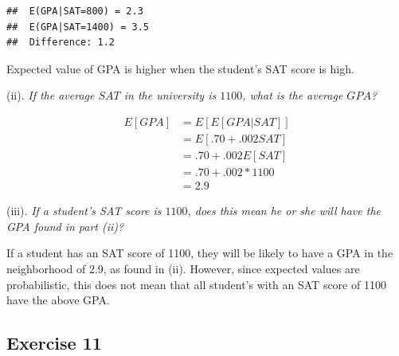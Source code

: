 \documentclass[
]{article}
\begin{document}
\begin{verbatim}
##  E(GPA|SAT=800) = 2.3 
##  E(GPA|SAT=1400) = 3.5 
##  Difference: 1.2
\end{verbatim}

Expected value of GPA is higher when the student's SAT score is high.

(ii).
\textit{If the average $SAT$ in the university is $1100$, what is the average $GPA$?}

\[\begin{aligned} 
E[GPA] &= E[E[GPA|SAT]] \\
&= E[.70 + .002SAT] \\
&= .70 + .002E[SAT] \\
&= .70 + .002 * 1100 \\
&= 2.9
\end{aligned}\]

(iii).
\textit{If a student's SAT score is $1100$, does this mean he or she will have the GPA found in part (ii)?}

If a student has an SAT score of 1100, they will be likely to have a GPA
in the neighborhood of 2.9, as found in (ii). However, since expected
values are probabilistic, this does not mean that all student's with an
SAT score of 1100 have the above GPA.

\hypertarget{exercise-11}{%
\subsection{Exercise 11}\label{exercise-11}}
\end{document}
